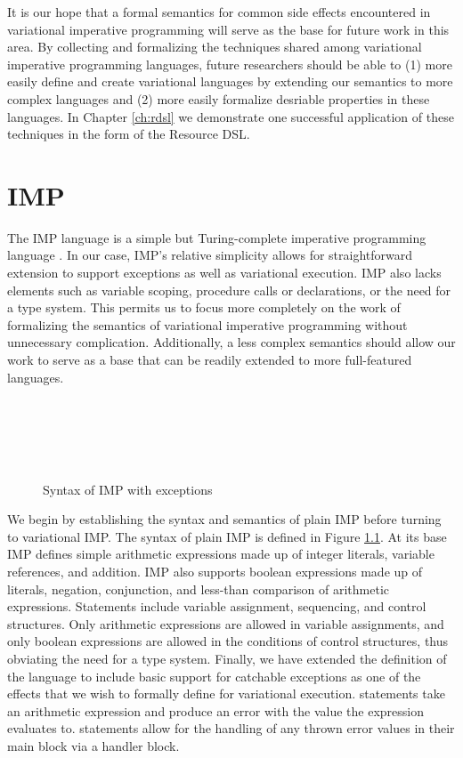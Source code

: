 \documentclass[12pt,oneside]{book}
\begin{document}
It is our hope that a formal semantics for common side effects encountered in variational imperative programming
will serve as the base for future work in this area. By collecting and formalizing the techniques shared among variational
imperative programming languages, future researchers should be able to (1) more easily define and create variational
languages by extending our semantics to more complex languages and (2) more easily formalize desriable properties in these languages.
In Chapter \ref{ch:rdsl} we demonstrate one successful application
of these techniques in the form of the Resource DSL.

\chapter{IMP}
\label{ch:imp}

The IMP language is a simple but Turing-complete imperative programming language \cite{winskel1993formal,nipkow1998winskel,nipkow2014concrete}.
In our case, IMP's relative simplicity allows for straightforward extension to support exceptions as well as variational execution. IMP also lacks elements such
as variable scoping, procedure calls or declarations, or the need for a type system. This permits us to focus more completely on the work of formalizing
the semantics of variational imperative programming without unnecessary complication. Additionally, a less complex semantics should allow our work to
serve as a base that can be readily extended to more full-featured languages.

\begin{figure}
\begin{syntax}
\\
\IMPArith
{} \\
\IMPBLit
{} \\
\IMPBool
{} \\
\IMPStmt
\end{syntax}
\caption{Syntax of IMP with exceptions}
\label{fig:impsyn}
\end{figure}

We begin by establishing the syntax and semantics of plain IMP before turning to variational IMP. The syntax of plain IMP is defined in Figure \ref{fig:impsyn}.
At its base IMP defines simple arithmetic expressions made up of integer literals, variable references, and addition. IMP also supports boolean expressions
made up of literals, negation, conjunction, and less-than comparison of arithmetic expressions. Statements include variable assignment, sequencing, and
control structures. Only arithmetic expressions are allowed in variable assignments, and only boolean expressions are allowed in the conditions of control
structures, thus obviating the need for a type system. Finally, we have extended the definition of the language to include basic support for catchable exceptions
as one of the effects that we wish to formally define for variational execution.  statements take an arithmetic expression and produce an
error with the value the expression evaluates to.  statements allow for the handling of any thrown error values in their main block via a
handler block.
\end{document}
